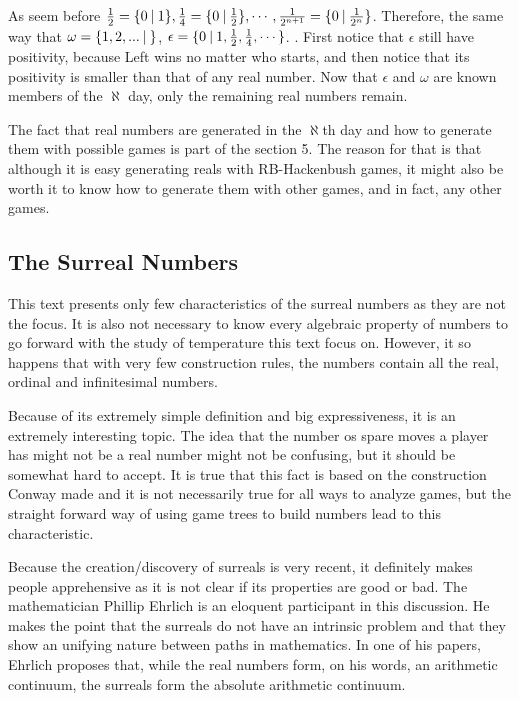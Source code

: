 As seem before $\frac{1}{2} = \mbox{$\{0\:|\:1\}$}, \frac{1}{4} = \mbox{$\{0\:|\:\frac{1}{2}\}$}, \cdots, \frac{1}{2^{n+1}} = \mbox{$\{0\:|\:\frac{1}{2^n}\}$}$. Therefore, the same way that $\omega=\mbox{$\{1,2,...\:|\:\}$}$, $\epsilon=\mbox{$\{0\:|\:1,\frac{1}{2},\frac{1}{4},\cdots\}$}$. . First notice that $\epsilon$ still have positivity, because Left wins no matter who starts, and then notice that its positivity is smaller than that of any real number. Now that $\epsilon$ and $\omega$ are known members of the $\aleph$ day, only the remaining real numbers remain.

The fact that real numbers are generated in the $\aleph$th day and how to generate them with possible games is part of the section 5. The reason for that is that although it is easy generating reals with RB-Hackenbush games, it might also be worth it to know how to generate them with other games, and in fact, any other games.

\subsection*{The Surreal Numbers}

This text presents only few characteristics of the surreal numbers as they are not the focus. It is also not necessary to know every algebraic property of numbers to go forward with the study of temperature this text focus on. However, it so happens that with very few construction rules, the numbers contain all the real, ordinal and infinitesimal numbers.

Because of its extremely simple definition and big expressiveness, it is an extremely interesting topic. The idea that the number os spare moves a player has might not be a real number might not be confusing, but it should be somewhat hard to accept. It is true that this fact is based on the construction Conway made and it is not necessarily true for all ways to analyze games, but the straight forward way of using game trees to build numbers lead to this characteristic.

Because the creation/discovery of surreals is very recent, it definitely makes people apprehensive as it is not clear if its properties are good or bad. The mathematician Phillip Ehrlich is an eloquent participant in this discussion. He makes the point that the surreals do not have an intrinsic problem and that they show an unifying nature between paths in mathematics. In one of his papers, Ehrlich proposes that, while the real numbers form, on his words, an arithmetic continuum, the surreals form the absolute arithmetic continuum.

